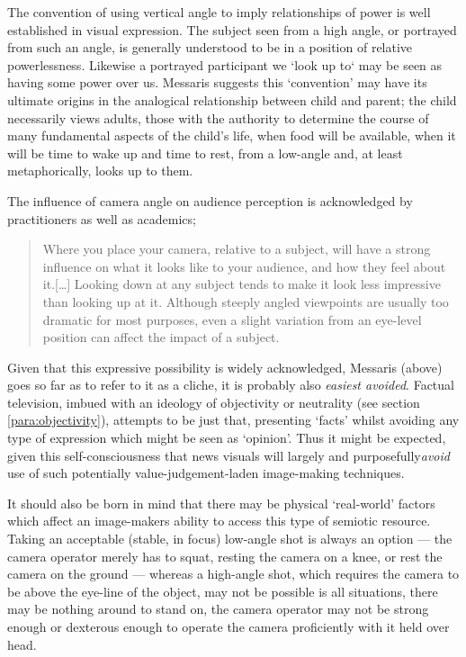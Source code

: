 The convention of using vertical angle to imply relationships of power is well established in visual expression. The subject seen from a high angle, or portrayed from such an angle, is generally understood to be in a position of relative powerlessness. Likewise a portrayed participant we `look up to` may be seen as having some power over us. Messaris suggests this `convention' may have its ultimate origins in the analogical relationship between child and parent; the child necessarily views adults, those with the authority to determine the course of many fundamental aspects of the child's life, when food will be available, when it will be time to wake up and time to rest, from a low-angle and, at least metaphorically, looks up to them.

The influence of camera angle on audience perception is acknowledged by practitioners as well as academics;

\begin{quote}
Where you place your camera, relative to a subject, will have a strong influence on what it looks like to your audience, and how they feel about it.[\ldots] Looking down at any subject tends to make it look less impressive than looking up at it. Although steeply angled viewpoints are usually too dramatic for most purposes, even a slight variation from an eye-level position can affect the impact of a subject. \citep[56]{Millerson:2001}
\end{quote}

Given that this expressive possibility is widely acknowledged, Messaris (above) goes so far as to refer to it as a cliche, it is probably also \emph{easiest avoided}. Factual television, imbued with an ideology of objectivity or neutrality (see section \ref{para:objectivity}), attempts to be just that, presenting `facts' whilst avoiding any type of expression which might be seen as `opinion'. Thus it might be expected, given this self-consciousness that news visuals will largely and purposefully\textit{avoid }use of such potentially value-judgement-laden image-making techniques. 

It should also be born in mind that there may be physical `real-world' factors which affect an image-makers ability to access this type of semiotic resource. Taking an acceptable (stable, in focus) low-angle shot is always an option --- the camera operator merely has to squat, resting the camera on a knee, or rest the camera on the ground --- whereas a high-angle shot, which requires the camera to be above the eye-line of the object, may not be possible is all situations, there may be nothing around to stand on, the camera operator may not be strong enough or dexterous enough to operate the camera proficiently with it held over head.

